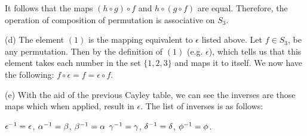\documentclass[12pt, a4paper]{article}
\begin{document}
\begin{flushleft}
\begin{flushleft}
\end{flushleft}

\begin{flushleft}

\hspace*{16.7mm}It follows that the maps $(h\circ g)\circ f$ and $h\circ (g\circ f)$ are equal. Therefore,\linebreak
\hspace*{16.7mm}the operation of composition of permutation is associative on $S_3$.\vspace*{3mm}\linebreak

\end{flushleft}

\begin{flushleft}

\hspace*{10mm}(d) The element $(1)$ is the mapping equivalent to $\epsilon$ listed above. Let $f \in S_3$,\linebreak
\hspace*{16.7mm}be any permutation. Then by the definition of $(1)$ (e.g. $\epsilon$), which tells us
\hspace*{16.7mm}that this element takes each number in the set $\{1,2,3\}$ and maps it to itself.
\hspace*{16.7mm}We now have the following: $f\circ \epsilon= f = \epsilon\circ f$.\vspace*{25mm}\linebreak

\hspace*{10mm}(e) With the aid of the previous Cayley table, we can see the inverses are those
\hspace*{16.7mm}maps which when applied, result in $\epsilon$. The list of inverses is as follows:\vspace*{4mm}\linebreak

\end{flushleft}

\centering
$\large\epsilon^{-1}=\large\epsilon$, \hspace*{3mm} $\large\alpha^{-1}=\large\beta$, \hspace*{3mm} 
$\large\beta^{-1}=\large\alpha$\vspace*{3mm}\linebreak
$\large\gamma^{-1}=\large\gamma$, \hspace*{3mm} $\large\delta^{-1}=\large\delta$, \hspace*{3mm}
$\large\phi^{-1}=\large\phi$.\vspace{4mm}\linebreak



\end{flushleft}
\end{document}
